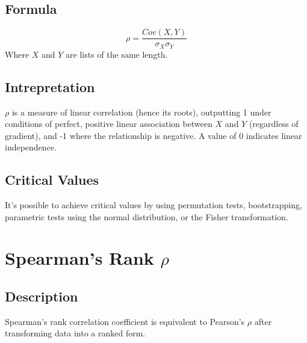 \documentclass[11pt]{article}
\begin{document}
\subsection{Formula}
$$
\rho = \frac{Cov(X,Y)}{\sigma_X \sigma_Y}
$$
Where $X$ and $Y$ are lists of the same length.

\subsection{Intrepretation}
$\rho$ is a measure of linear correlation (hence its roots), outputting 1 under conditions of perfect, positive linear association between $X$ and $Y$ (regardless of gradient), and -1 where the relationship is negative.  A value of 0 indicates linear independence.  

\subsection{Critical Values}
It's possible to achieve critical values by using permutation tests, bootstrapping, parametric tests using the normal distribution, or the Fisher transformation.







\section{Spearman's Rank $\rho$} %
\subsection{Description}
Spearman's rank correlation coefficient is equivalent to Pearson's $\rho$ after transforming data into a ranked form.
\end{document}
